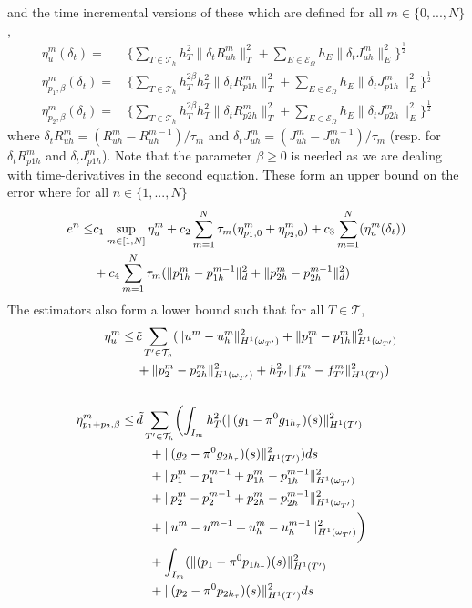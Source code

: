 and the time incremental versions of these which are defined for all $m \in \{0,...,N\}$, 
\begin{align}
\eta^m_u(\delta_t) = & \,\bigl\{\sum_{T \in \mathcal{T}_h} h_T^2 \|\delta_t R^m_{uh}\|_T^2 + \sum_{E \in \mathcal{E}_\Omega} h_E \|\delta_t J^m_{uh}\|_E^2 \bigr\}^{\frac{1}{2}} \\
\eta^m_{p_1,\beta}(\delta_t) = & \, \bigl\{\sum_{T \in \mathcal{T}_h} h_T^{2\beta} h_T^2 \|\delta_t R^m_{p1h}\|_T^2  + \sum_{E \in \mathcal{E}_\Omega} h_E \|\delta_t J^m_{p1h}\|_E^2 \bigr\}^{\frac{1}{2}} \\
\eta^m_{p_2,\beta}(\delta_t) = & \, \bigl\{\sum_{T \in \mathcal{T}_h} h_T^{2\beta} h_T^2 \|\delta_t R^m_{p2h}\|_T^2  + \sum_{E \in \mathcal{E}_\Omega} h_E \|\delta_t J^m_{p2h}\|_E^2 \bigr\}^{\frac{1}{2}}
\end{align}
where $\delta_t R^m_{uh} = (R_{uh}^m - R_{uh}^{m-1})/\tau_m$ and $\delta_t J^m_{uh} = (J_{uh}^m - J_{uh}^{m-1})/\tau_m$ (resp. for $\delta_t R^m_{p1h}$ and $\delta_t J^m_{p1h}$). Note that the parameter $\beta \geq 0$ is needed as we are dealing with time-derivatives in the second equation. These form an upper bound on the error where for all $n \in \{1,...,N\}$
\begin{align}
e^n \leq & c_1\sup_{m \in [1,N]} \eta^m_u  + c_2\sum_{m=1}^N \tau_m (\eta^m_{p_1,0} + \eta^m_{p_2,0}) + c_3\sum_{m=1}^N (\eta^m_u(\delta_t)) \\
& + c_4\sum_{m=1}^N \tau_m (\|p^m_{1h} - p^{m-1}_{1h}\|_d^2 + \|p^m_{2h} - p^{m-1}_{2h}\|_d^2) \notag
\end{align}
The estimators also form a lower bound such that for all $T \in \mathcal{T}$,
\begin{align}
\eta^m_u \leq & \, \tilde{c}\sum_{T' \in \mathcal{T}_h} ( \|u^m-u^m_h \|^2_{H^1(\omega_{T'})} + \|p_1^m-p^m_{1h} \|^2_{H^1(\omega_{T'})} \\
& \, + \|p_2^m-p^m_{2h} \|^2_{H^1(\omega_{T'})} + h_{T'}^2 \|f^m_h-f^m_{T'}\|^2_{H^1(T')} ) \notag 
\notag\\ \notag\\
\eta^m_{p_1 + p_2,\beta} \leq & \, \tilde{d} \sum_{T' \in \mathcal{T}_h} \biggl(\int_{I_m} h_{T}^2 (\|(g_1-\pi^0g_{1h_\tau})(s)\|^2_{H^1(T')} \\
& \quad \, + \|(g_2-\pi^0g_{2h_\tau})(s)\|^2_{H^1(T')}) ds \notag \\
& \quad \, + \|p_1^m-p_1^{m-1} + p_{1h}^m-p_{1h}^{m-1} \|^2_{H^1(\omega_{T'})} \notag\\
& \quad \, + \|p_2^m-p_2^{m-1} + p_{2h}^m-p_{2h}^{m-1} \|^2_{H^1(\omega_{T'})} \notag\\
& \quad \, + \|u^m-u^{m-1} + u_h^m-u_h^{m-1} \|^2_{H^1(\omega_{T'})} \biggr) \notag\\
& \quad \, + \int_{I_m} (\|(p_1-\pi^0p_{1h_\tau})(s)\|^2_{H^1(T')} \notag\\
& \quad \, + \|(p_2-\pi^0p_{2h_\tau})(s)\|^2_{H^1(T')} ds \notag
\end{align}
